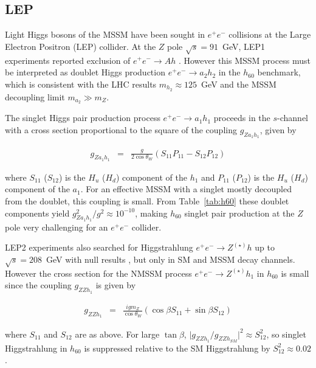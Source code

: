 \documentclass{ws-ijmpa}
\begin{document}
\subsection{LEP}


Light Higgs bosons of the MSSM have been sought in $e^+ e^-$ collisions at the Large Electron Positron (LEP) collider. At the $Z$ pole $\sqrt{s}=91$~GeV, LEP1 experiments reported exclusion of $e^+ e^- \rightarrow Ah$ \cite{Alexander:1996ai,Adriani:1992kt}. However this MSSM process must be interpreted as doublet Higgs production $e^+ e^- \rightarrow a_2 h_2$ in the $h_{60}$ benchmark, which is consistent with the LHC results $m_{h_2} \approx 125$~GeV and the MSSM decoupling limit $m_{a_2} \gg m_{Z}$. 

The singlet Higgs pair production process $e^+ e^- \rightarrow a_1 h_1$ proceeds in the $s$-channel with a cross section proportional to the square of the coupling $g_{Za_1 h_1}$, given by  \cite{Franke:1995tc}

\begin{eqnarray}
g_{Za_1 h_1} & = & \frac{g}{2 \cos \theta_W} \left( S_{11}P_{11} - S_{12}P_{12} \right)
\end{eqnarray}

\noindent where $S_{11}$ ($S_{12}$) is the $H_u$ ($H_d$) component of the $h_1$ and $P_{11}$ ($P_{12}$) is the $H_u$ ($H_d$) component of the $a_1$. For an effective MSSM with a singlet mostly decoupled from the doublet, this coupling is small. From Table~\ref{tab:h60} these doublet components yield $g^{2}_{Za_1 h_1}/g^2 \approx 10^{-10}$, making $h_{60}$ singlet pair production at the $Z$ pole very challenging for an $e^+ e^-$ collider.

LEP2 experiments also searched for Higgstrahlung $e^+ e^- \rightarrow Z^{(\star)}h$ up to $\sqrt{s}=208$~GeV with null results  \cite{Barate:2003sz}, but only in SM and MSSM decay channels. However the cross section for the NMSSM process $e^+e^- \rightarrow Z^{(\star)} h_1$ in $h_{60}$ is small since the coupling $g_{ZZh_1}$  is given by \cite{Franke:1995tc}

\begin{eqnarray}
g_{ZZh_1} & = & \frac{igm_{Z}}{\cos \theta_W} \left( \cos \beta S_{11}+ \sin \beta S_{12} \right)
\end{eqnarray}

\noindent where $S_{11}$ and $S_{12}$ are as above. For large $\tan \beta$, $\vert g_{ZZh_1}/g_{ZZh_{SM}}\vert^2 \approx S_{12}^2$, so singlet Higgstrahlung in $h_{60}$ is suppressed relative to the SM Higgstrahlung by $S_{12}^2 \approx 0.02$.
\end{document}
